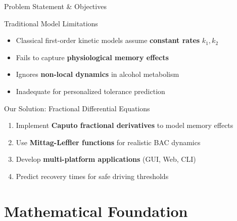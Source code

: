 \documentclass[aspectratio=169]{beamer}
\newcommand{\highlight}[1]{\textcolor{kentech_orange}{\textbf{#1}}}
\begin{document}
\begin{frame}{Problem Statement \& Objectives}
    \begin{block}{Traditional Model Limitations}
        \begin{itemize}
            \item Classical first-order kinetic models assume \highlight{constant rates} $k_1, k_2$
            \item Fails to capture \highlight{physiological memory effects}
            \item Ignores \highlight{non-local dynamics} in alcohol metabolism
            \item Inadequate for personalized tolerance prediction
        \end{itemize}
    \end{block}
    
    \vspace{0.5cm}
    
    \begin{block}{Our Solution: Fractional Differential Equations}
        \begin{enumerate}
            \item Implement \highlight{Caputo fractional derivatives} to model memory effects
            \item Use \highlight{Mittag-Leffler functions} for realistic BAC dynamics
            \item Develop \highlight{multi-platform applications} (GUI, Web, CLI)
            \item Predict recovery times for safe driving thresholds
        \end{enumerate}
    \end{block}
\end{frame}

\section{Mathematical Foundation}
\end{document}
